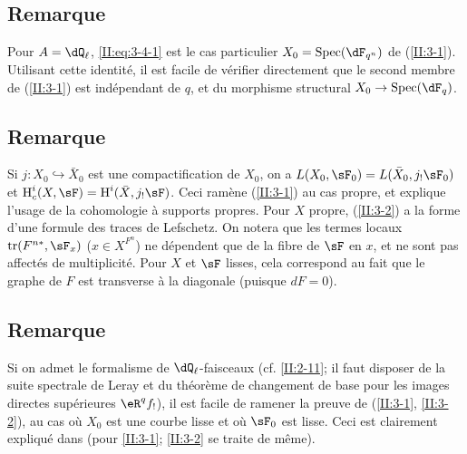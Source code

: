 \subsection{Remarque}\label{II:3-5}

Pour $A=\dQ_\ell$, \eqref{II:eq:3-4-1} est le cas particulier 
$X_0=\spec(\dF_{q^n})$ de (\ref{II:3-1}). Utilisant cette identité, il est 
facile de vérifier directement que le second membre de (\ref{II:3-1}) est 
indépendant de $q$, et du morphisme structural $X_0\to\spec(\dF_q)$. 





\subsection{Remarque}\label{II:3-6}

Si $j:X_0\hookrightarrow \bar X_0$ est une compactification de $X_0$, on a 
$L(X_0,\sF_0) = L(\bar X_0, j_!\sF_0)$ et 
$\h_c^i(X,\sF) = \h^i(\bar X,j_!\sF)$. Ceci ramène (\ref{II:3-1}) au cas 
propre, et explique l'usage de la cohomologie à supports propres. Pour $X$ 
propre, (\ref{II:3-2}) a la forme d'une formule des traces de Lefschetz. On 
notera que les termes locaux $\tr(F^{n *},\sF_x)$ ($x\in X^{F^n}$) ne 
dépendent que de la fibre de $\sF$ en $x$, et ne sont pas affectés de 
multiplicité. Pour $X$ et $\sF$ lisses, cela correspond au fait que le graphe 
de $F$ est transverse à la diagonale (puisque $d F = 0$). 





\subsection{Remarque}\label{II:3-7}

Si on admet le formalisme de $\dQ_\ell$-faisceaux (cf. \ref{II:2-11}; il faut 
disposer de la suite spectrale de Leray et du théorème de changement de 
base pour les images directes supérieures $\eR^q f_!$), il est facile de 
ramener la preuve de (\ref{II:3-1}, \ref{II:3-2}), au cas où $X_0$ est 
une courbe lisse et où $\sF_0$ est lisse. Ceci est clairement expliqué 
dans \cite[\S 5]{gr95} (pour \ref{II:3-1}; \ref{II:3-2} se traite de même). 





\subsection{}\label{II:3-8}

